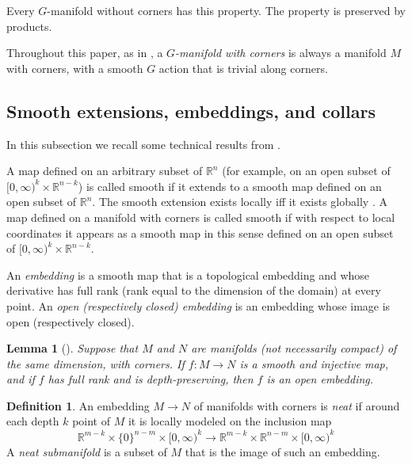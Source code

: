 \documentclass[11pt]{amsart}
\newtheorem{lem}{Lemma}[section]
\theoremstyle{definition}
\newtheorem{defn}{Definition}[section]
\numberwithin{equation}{section}
\numberwithin{figure}{section}
\newcommand{\R}{\mathbb R}
\newcommand{\ourdefn}[1]{{\it #1}}
\begin{document}
	Every $G$-manifold without corners has this property. The property is preserved by products.
	
	Throughout this paper, as in \cite{GIMM1}, a \ourdefn{$G$-manifold with corners} is always a manifold $M$ with corners, with a smooth $G$ action that is trivial along corners. 

\subsection{Smooth extensions, embeddings, and collars}\label{collarsetc}

In this subsection we recall some technical results from \cite{GIMM1}.

A map defined on an arbitrary subset of $ \R^{n}$ (for example, on an open subset of $[0,\infty)^k \times \R^{n-k}$) is called smooth if it extends to a smooth map defined on an open subset of $\R^n$. The smooth extension exists locally iff it exists globally \cite[Lem 2.12]{GIMM1}. A map defined on a manifold with corners is called smooth if with respect to local coordinates it appears as a smooth map in this sense defined on an open subset of $[0,\infty)^k \times \R^{n-k}$.

An \ourdefn{embedding} is a smooth map that is a topological embedding and whose derivative has full rank (rank equal to the dimension of the domain) at every point. An \ourdefn{open (respectively closed) embedding} is an embedding whose image is open (respectively closed).

\begin{lem}[{\cite[Lem 2.19]{GIMM1}}]\label{depth_preserving_means_open_embedding}
	Suppose that $M$ and $N$ are manifolds (not necessarily compact) of the same dimension, with corners. If $f\colon M \to N$ is a smooth and injective map, and if $f$ has full rank and is depth-preserving, then $f$ is an open embedding.
\end{lem}

\begin{defn}\label{neat_embedding}
An embedding $M\to N$ of manifolds with corners is \ourdefn{neat} if around each depth $k$ point of $M$ it is locally modeled on the inclusion map
\[  \R^{m-k} \times \{0\}^{n-m} \times [0,\infty)^k \to  \R^{m-k} \times \R^{n-m} \times [0,\infty)^k \] 
A \ourdefn{neat submanifold} is a subset of $M$ that is the image of such an embedding.
\end{defn}
\end{document}
